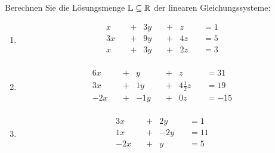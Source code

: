 	\newcommand{\lgslinethree}[4]{#1 x\quad &+&  #2 y\quad &+&  #3 z\quad & = #4 \\}
	\newcommand{\lgslinetwo}[3]{#1 x\quad &+&  #2 y\quad & = #3 \\}
	Berechnen Sie die Lösungsmenge $\mathbb{L}\subseteq\mathbb{R}$ der linearen Gleichungssysteme:
	\begin{multicols}{2}
		\begin{enumerate}
			\item
			\begin{alignat*}{5}
				\lgslinethree{}{3}{}{1}
				\lgslinethree{3}{9}{4}{5}
				\lgslinethree{}{3}{2}{3}
			\end{alignat*}
			\item
			\begin{alignat*}{4}
				\lgslinethree{6}{}{}{31}
				\lgslinethree{3}{1}{4\frac 1 2}{19}
				\lgslinethree{-2}{-1}{0}{-15}
			\end{alignat*}
			\item
			\begin{alignat*}{4}
				\lgslinetwo{3}{2}{1}
				\lgslinetwo{1}{-2}{11}
				\lgslinetwo{-2}{}{5}
			\end{alignat*}
		\end{enumerate}
	\end{multicols}



\begin{lsg}{}

\end{lsg}


